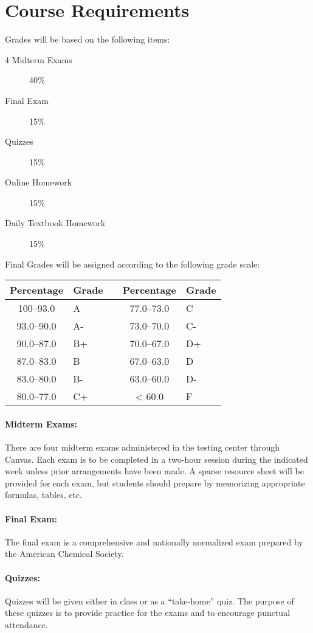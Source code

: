\documentclass[12pt, letterpaper]{article}
\begin{document}
\section*{Course Requirements}
Grades will be based on the following items:
\begin{description}
	\item[4 Midterm Exams] 40\%
	\item[Final Exam] 15\%
	\item[Quizzes] 15\%
	\item[Online Homework] 15\%
	\item[Daily Textbook Homework] 15\%
\end{description}
Final Grades will be assigned according to the following grade scale:

\begin{tabular}{cl|c|cl}
	Percentage & Grade &  & Percentage & Grade \\ \midrule
	100--93.0  & A     &  & 77.0--73.0 & C     \\
	93.0--90.0 & A-    &  & 73.0--70.0 & C-    \\
	90.0--87.0 & B+    &  & 70.0--67.0 & D+    \\
	87.0--83.0 & B     &  & 67.0--63.0 & D     \\
	83.0--80.0 & B-    &  & 63.0--60.0 & D-    \\
	80.0--77.0 & C+    &  & < 60.0     & F
\end{tabular}

\paragraph{Midterm Exams:}
There are four midterm exams administered in the testing center through Canvas. Each exam is to be completed in a two-hour session during the indicated week unless prior arrangements have been made. A sparse resource sheet will be provided for each exam, but students should prepare by memorizing appropriate formulas, tables, etc.

\paragraph{Final Exam:}
The final exam is a comprehensive and nationally normalized exam prepared by the American Chemical Society.

\paragraph{Quizzes:}
Quizzes will be given either in class or as a ``take-home'' quiz. The purpose of these quizzes is to provide practice for the exams and to encourage punctual attendance.
\end{document}
